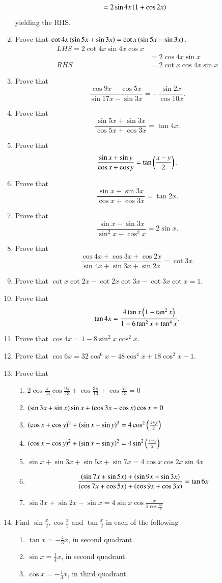 \begin{enumerate}[label=\thesubsection.\arabic*,ref=\thesubsection.\theenumi,itemsep=1ex]
\begin{align}
	&=2\sin4x\left(1+\cos 2x\right) 
\end{align}
yielding the RHS.
\item Prove that
$\cot4x\left(\sin5x+\sin3x\right)= \cot x\left(\sin5x-\sin3x\right).$
%
\\
\solution  
\begin{align}
	LHS = 
2\cot4x\sin4x\cos x
\\
	&= 
2\cos4x\sin x
	\\
	RHS&=2\cot x\cos 4x \sin x
\end{align}
\item Prove that
$$\frac{\cos9x-\cos5x}{\sin17x-\sin3x}=-\frac{\sin2x}{\cos10x}.$$
%
\item Prove that
$$\frac{\sin5x+\sin3x}{\cos5x+\cos3x}=\tan4x.$$
%
\item Prove that
$$\frac{\sin x+\sin y}{\cos x+\cos y}=\tan\left(\frac{x-y}{2}\right).$$
%
\item Prove that
$$\frac{\sin x+\sin3x}{\cos x+\cos3x}=\tan2x.$$
%
\item Prove that
$$\frac{\sin x-\sin3x}{\sin^{2}x-\cos^{2}x}=2\sin x.$$
%
\item Prove that
$$\frac{\cos4x+\cos3x+\cos2x}{\sin4x+\sin3x+\sin2x}=\cot3x.$$
%
\item Prove that
$\cot x\cot2x-\cot2x\cot3x-\cot3x\cot x=1$.
%
\item Prove that
$$\tan4x=\frac{4\tan x\left(1-\tan^{2}x\right)}{1-6\tan^{2}x+\tan^{4}x}.$$
%
\item Prove that
$\cos4x=1-8\sin^{2}x\cos^{2}x$.
%
\item Prove that
$\cos6x=32\cos^{6}x-48\cos^{4}x+18\cos^{2}x-1$.
%
%
\item Prove that
\begin{enumerate}
\item 2$\cos\frac{\pi}{13}\cos\frac{9\pi}{13}+\cos\frac{3\pi}{13}+\cos\frac{5\pi}{13}=0$
\item $\left(\sin3x+\sin x\right)\sin x+\left(\cos3x-\cos x\right)\cos x=0$
\item $\left(\cos x+\cos y\right)^{2}+\left(\sin x-\sin y\right)^{2}=4\cos^{2}\left(\frac{x+y}{2}\right)$
\item $\left(\cos x-\cos y\right)^{2}+\left(\sin x-\sin y\right)^{2}=4\sin^{2}\left(\frac{x-y}{2}\right)$
\item $\sin x+\sin3x+\sin5x+\sin7x=4\cos x\cos2x\sin4x$
\item $$\frac{\left(\sin7x+\sin5x\right)+\left(\sin9x+\sin3x\right)}{\left(\cos7x+\cos5x\right)+\left(\cos9x+\cos3x\right)}=\tan6x$$
\item $\sin3x+\sin2x-\sin x=4\sin x\cos\frac{x}{2\cos\frac{3x}{2}}$
\end{enumerate}
%
\item Find $\sin\frac{x}{2},\cos\frac{x}{2}$ and $\tan\frac{x}{2}$ in each of the following
\begin{enumerate}
\item $\tan x=-\frac{4}{3}x$,  in second quadrant. 
\item $\sin x=\frac{1}{4}x$,   in second quadrant.
\item $\cos x=-\frac{1}{3}x$,  in third quadrant.
\end{enumerate}
    

\end{enumerate}
